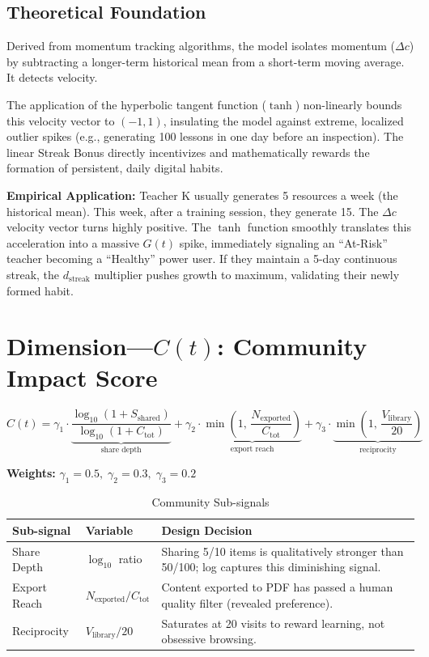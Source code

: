 \documentclass[11pt,a4paper]{article}
\begin{document}
\subsection{Theoretical Foundation}
Derived from momentum tracking algorithms, the model isolates momentum ($\Delta c$) by subtracting a longer-term historical mean from a short-term moving average. It detects velocity. 

The application of the hyperbolic tangent function ($\tanh$) non-linearly bounds this velocity vector to $(-1, 1)$, insulating the model against extreme, localized outlier spikes (e.g., generating 100 lessons in one day before an inspection). The linear Streak Bonus directly incentivizes and mathematically rewards the formation of persistent, daily digital habits.

\textbf{Empirical Application:}
Teacher K usually generates 5 resources a week (the historical mean). This week, after a training session, they generate 15. The $\Delta c$ velocity vector turns highly positive. The $\tanh$ function smoothly translates this acceleration into a massive $G(t)$ spike, immediately signaling an ``At-Risk'' teacher becoming a ``Healthy'' power user. If they maintain a 5-day continuous streak, the $d_{\text{streak}}$ multiplier pushes growth to maximum, validating their newly formed habit.

\section{Dimension---$C(t)$: Community Impact Score}

\begin{equation}
    C(t) = \gamma_1 \cdot \underbrace{\frac{\log_{10}(1 + S_{\text{shared}})}{\log_{10}(1 + C_{\text{tot}})}}_{\text{share depth}} + \gamma_2 \cdot \underbrace{\min\!\left(1,\,\frac{N_{\text{exported}}}{C_{\text{tot}}}\right)}_{\text{export reach}} + \gamma_3 \cdot \underbrace{\min\!\left(1,\,\frac{V_{\text{library}}}{20}\right)}_{\text{reciprocity}}
\end{equation}

\noindent \textbf{Weights:} $\gamma_1 = 0.5,\; \gamma_2 = 0.3,\; \gamma_3 = 0.2$

\begin{table}[H]
    \centering
    \caption{Community Sub-signals}
    \begin{tabular}{l l p{8cm}}
        \toprule
        \textbf{Sub-signal} & \textbf{Variable} & \textbf{Design Decision} \\
        \midrule
        Share Depth & $\log_{10}$ ratio & Sharing 5/10 items is qualitatively stronger than 50/100; log captures this diminishing signal. \\
        Export Reach & $N_{\text{exported}} / C_{\text{tot}}$ & Content exported to PDF has passed a human quality filter (revealed preference). \\
        Reciprocity & $V_{\text{library}} / 20$ & Saturates at 20 visits to reward learning, not obsessive browsing. \\
        \bottomrule
    \end{tabular}
\end{table}
\end{document}
